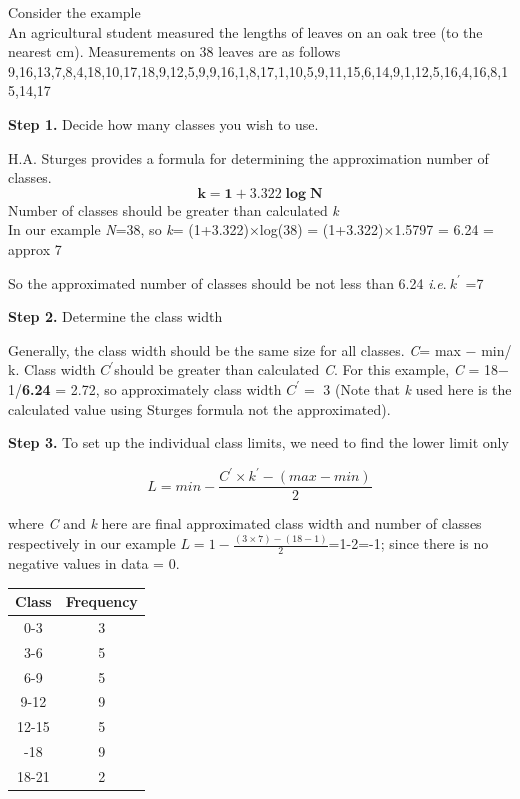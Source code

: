 \documentclass[
]{book}
\begin{document}
Consider the example\\
An agricultural student measured the lengths of leaves on an oak tree
(to the nearest cm). Measurements on 38 leaves are as follows\\
9,16,13,7,8,4,18,10,17,18,9,12,5,9,9,16,1,8,17,1,10,5,9,11,15,6,14,9,1,12,5,16,4,16,8,15,14,17

\textbf{Step 1.} Decide how many classes you wish to use.

H.A. Sturges provides a formula for determining the approximation number
of classes. \[\mathbf{k = 1 + 3.322}\mathbf{\log}\mathbf{N}\] Number of
classes should be greater than calculated \emph{k}\\
In our example \emph{N}=38, so \emph{k}= (1+3.322)×log(38) = (1+3.322)×1.5797 =
6.24 = approx 7

So the approximated number of classes should be not less than 6.24
\emph{i}.\emph{e}.\(\ k^{'}\) =7

\textbf{Step 2.} Determine the class width

Generally, the class width should be the same size for all classes. \emph{C}=
\textbar{} max − min\textbar/ k. Class width \(C^{'}\)should be greater than calculated
\emph{C}. For this example, \emph{C} = \textbar{} 18− 1\textbar/\textbf{6.24} = 2.72, so
approximately class width \(C^{'} =\) 3 (Note that \emph{k} used here is the
calculated value using Sturges formula not the approximated).

\textbf{Step 3.} To set up the individual class limits, we need to find the
lower limit only

\[L = min - \frac{C^{'} \times k^{'} - (max - min)}{2}\]

where \emph{C} and \emph{k} here are final approximated class width and number of
classes respectively in our example
\(L = 1 - \frac{(3 \times 7) - (18 - 1)}{2}\)=1-2=-1; since there is no
negative values in data = 0.

\begin{table}[H]
\centering\centering
\begin{tabular}[t]{cc}
\toprule
Class & Frequency\\
\midrule
0-3 & 3\\
3-6 & 5\\
6-9 & 5\\
9-12 & 9\\
12-15 & 5\\
\addlinespace
15-18 & 9\\
18-21 & 2\\
\bottomrule
\end{tabular}
\end{table}
\end{document}
